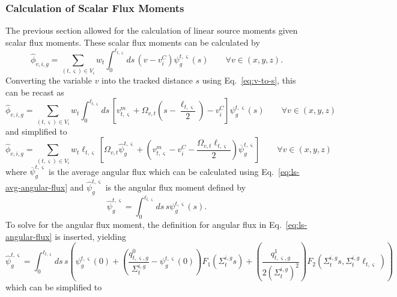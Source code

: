 \subsubsection{Calculation of Scalar Flux Moments}
\label{sec:ls-moments}
The previous section allowed for the calculation of linear source moments given scalar flux moments. These scalar flux moments can be calculated by
\begin{equation}
\hat{\phi}_{v,i,g} = \sum_{(t,\varsigma) \in V_i} w_t \int_{0}^{\ell_{t,\varsigma}} ds \, \left(v - v^C_i\right) \psi^{t,\varsigma}_g(s) \qquad \forall v \in (x,y,z).
\end{equation}
Converting the variable $v$ into the tracked distance $s$ using Eq.~\ref{eq:v-to-s}, this can be recast as
\begin{equation}
\hat{\phi}_{v,i,g} = \sum_{(t,\varsigma) \in V_i} w_t \int_{0}^{\ell_{t,\varsigma}} ds \, \left[v^m_{t,\varsigma} + \Omega_{v,t} \left(s - \frac{\ell_{t,\varsigma}}{2} \right) - v^C_i \right] \psi^{t,\varsigma}_g(s) \qquad \forall v \in (x,y,z)
\end{equation}
and simplified to
\begin{equation}
\hat{\phi}_{v,i,g} = \sum_{(t,\varsigma) \in V_i} w_t \ell_{t,\varsigma} \left[\Omega_{v,t} \hat{\psi}^{t,\varsigma}_g +  \left( v^m_{t,\varsigma}- v^C_i - \frac{\Omega_{v,t} \ell_{t,\varsigma}}{2} \right) \overline{\psi}^{t,\varsigma}_g \right] \qquad \forall v \in (x,y,z)
\label{eq:flux-moments-1}
\end{equation}
where $\overline{\psi}^{t,\varsigma}_g$ is the average angular flux which can be calculated using Eq.~\ref{eq:ls-avg-angular-flux} and $ \hat{\psi}^{t,\varsigma}_g$ is the angular flux moment defined by
\begin{equation}
\hat{\psi}^{t,\varsigma}_g = \int_{0}^{\ell_{t,\varsigma}} ds \, s \psi^{t,\varsigma}_g(s).
\end{equation}
To solve for the angular flux moment, the definition for angular flux in Eq.~\ref{eq:ls-angular-flux} is inserted, yielding
\begin{equation}
\hat{\psi}^{t,\varsigma}_g = \int_{0}^{\ell_{t,\varsigma}} ds \, s \left(\psi^{t,\varsigma}_g(0) + \left( \frac{q^0_{t,\varsigma,g}}{\Sigma_{t}^{i,g}} - \psi_g^{t,\varsigma}(0) \right) F_1\left(\Sigma_{t}^{i,g} s \right) + \left(\frac{q^1_{t,\varsigma,g}}{2\left(\Sigma_{t}^{i,g}\right)^2}\right) F_2\left(\Sigma_{t}^{i,g} s, \Sigma_{t}^{i,g} \ell_{t,\varsigma} \right)\right)
\end{equation}
which can be simplified to
